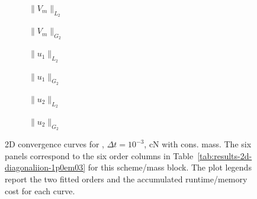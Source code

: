\begin{figure}[p]
\centering
\begin{subfigure}{0.485\linewidth}
\centering
{}
\caption{$\|V_m\|_{L_2}$}
\label{fig:results-2d-diagonaliion-1p0em03-cranknicolson-consistent-a}
\end{subfigure}
\hfill
\begin{subfigure}{0.485\linewidth}
\centering
{}
\caption{$\|V_m\|_{G_2}$}
\label{fig:results-2d-diagonaliion-1p0em03-cranknicolson-consistent-b}
\end{subfigure}
\par\vspace{0.8em}
\begin{subfigure}{0.485\linewidth}
\centering
{}
\caption{$\|u_1\|_{L_2}$}
\label{fig:results-2d-diagonaliion-1p0em03-cranknicolson-consistent-c}
\end{subfigure}
\hfill
\begin{subfigure}{0.485\linewidth}
\centering
{}
\caption{$\|u_1\|_{G_2}$}
\label{fig:results-2d-diagonaliion-1p0em03-cranknicolson-consistent-d}
\end{subfigure}
\par\vspace{0.8em}
\begin{subfigure}{0.485\linewidth}
\centering
{}
\caption{$\|u_2\|_{L_2}$}
\label{fig:results-2d-diagonaliion-1p0em03-cranknicolson-consistent-e}
\end{subfigure}
\hfill
\begin{subfigure}{0.485\linewidth}
\centering
{}
\caption{$\|u_2\|_{G_2}$}
\label{fig:results-2d-diagonaliion-1p0em03-cranknicolson-consistent-f}
\end{subfigure}
\caption{2D convergence curves for , $\Delta t=10^{-3}$, cN with cons. mass. The six panels correspond to the six order columns in Table~\ref{tab:results-2d-diagonaliion-1p0em03} for this scheme/mass block. The plot legends report the two fitted orders and the accumulated runtime/memory cost for each curve.}
\label{fig:results-2d-diagonaliion-1p0em03-cranknicolson-consistent}
\end{figure}
\FloatBarrier

